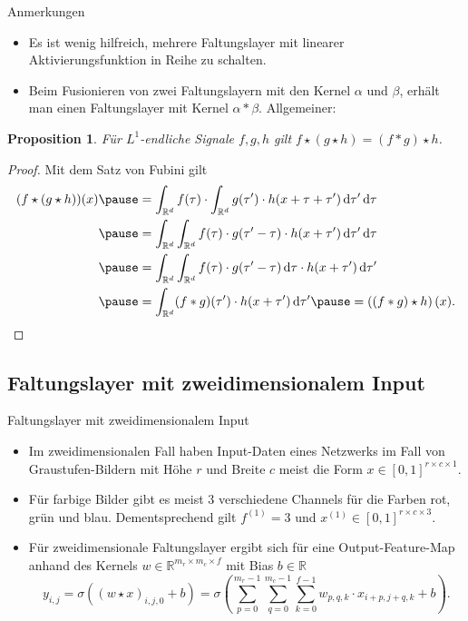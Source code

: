 \documentclass[envcountsect, smaller, aspectratio=149]{beamer}
\newtheorem{proposition}{Proposition}
\newcommand{\diff}{\,\textrm{d}}
\newcommand{\R}{\mathbb{R}}
\begin{document}
\begin{frame}[t]{Anmerkungen}
    \begin{itemize}
        \pause \item Es ist wenig hilfreich, mehrere Faltungslayer mit linearer Aktivierungsfunktion in Reihe zu schalten.
        \pause \item Beim Fusionieren von zwei Faltungslayern mit den Kernel $\alpha$ und $\beta$, erhält man einen Faltungslayer mit Kernel $\alpha *\beta$. \pause Allgemeiner:
    \end{itemize}
    \begin{proposition}
        Für $L^1$-endliche Signale $f,g,h$ gilt $f\star (g \star h) = (f*g)\star h$.
    \end{proposition}
    \pause \begin{proof}
        Mit dem Satz von Fubini gilt
        \[
            \begin{aligned}
            (f\star (g\star h))(x)
            \pause &= \int_{\R^d} f(\tau) \cdot \int_{\R^d} g(\tau') \cdot h(x+\tau+\tau')\diff \tau' \diff \tau \\
            \pause &= \int_{\R^d} \int_{\R^d} f(\tau) \cdot g(\tau' - \tau)\cdot h(x+\tau')\diff \tau' \diff \tau \\
            \pause &= \int_{\R^d}\int_{\R^d} f(\tau) \cdot g(\tau'-\tau) \diff\tau \cdot h(x+\tau')\diff\tau' \\
            \pause &= \int_{\R^d}  (f * g)(\tau')\cdot h(x+\tau') \diff \tau'
            \pause = \left( (f * g) \star h \right)(x).
            \qedhere
            \end{aligned}
        \]
    \end{proof}
\end{frame}


\subsection{Faltungslayer mit zweidimensionalem Input}

\begin{frame}{Faltungslayer mit zweidimensionalem Input}
    \begin{itemize}
        \item Im zweidimensionalen Fall haben Input-Daten eines Netzwerks im Fall von Graustufen-Bildern mit Höhe $r$ und Breite $c$ meist die Form $x\in[0,1]^{r\times c\times 1}$.
        \item Für farbige Bilder gibt es meist $3$ verschiedene Channels für die Farben rot, grün und blau.
        Dementsprechend gilt $f^{(1)} = 3$ und $x^{(1)}\in[0,1]^{r\times c \times 3}$.
        \item Für zweidimensionale Faltungslayer ergibt sich für eine Output-Feature-Map anhand des Kernels $w\in\R^{m_r\times m_c\times f}$ mit Bias $b\in\R$
        \[
            y_{i, j} = \sigma( (w \star x)_{i,j,0} + b ) = \sigma\left( \sum_{p=0}^{m_r - 1} \sum_{q=0}^{m_c - 1} \sum_{k=0}^{f-1} w_{p,q,k} \cdot x_{i+p, j+q,k} + b \right).
        \]
    \end{itemize}
\end{frame}
\end{document}
